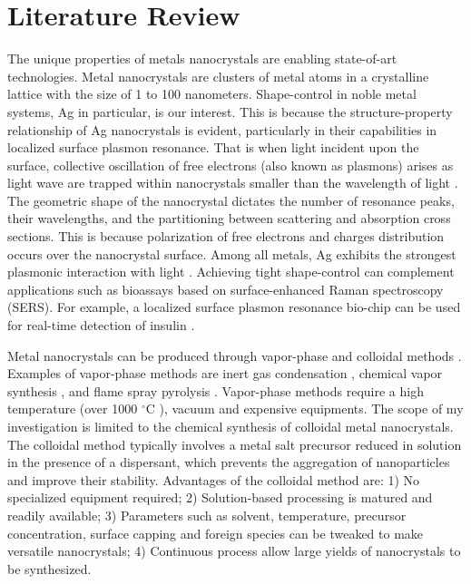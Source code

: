 \section{Literature Review}

The unique properties of metals nanocrystals are enabling state-of-art technologies.
Metal nanocrystals are clusters of metal atoms in a crystalline lattice with the size of 1 to 100 nanometers.
Shape-control in noble metal systems, Ag in particular, is our interest.
This is because the structure-property relationship of Ag nanocrystals is evident, particularly in their capabilities in localized surface plasmon resonance.
That is when light incident upon the surface, collective oscillation of free electrons (also known as plasmons) arises as light wave are trapped within nanocrystals smaller than the wavelength of light \cite{Petryayeva_2011}.
The geometric shape of the nanocrystal dictates the number of resonance peaks, their wavelengths, and the partitioning between scattering and absorption cross sections.
This is because polarization of free electrons and charges distribution occurs over the nanocrystal surface.
Among all metals, Ag exhibits the strongest plasmonic interaction with light \cite{Lu_2009}.
Achieving tight shape-control can complement applications such as bioassays based on surface-enhanced Raman spectroscopy (SERS).
For example, a localized surface plasmon resonance bio-chip can be used for real-time detection of insulin \cite{Hiep_2008}.

Metal nanocrystals can be produced through vapor-phase \cite{Swihart_2003} and colloidal methods \cite{Tao_2008}. Examples of vapor-phase methods are inert gas condensation \cite{Wegner_2002,Simchi_2007}, chemical vapor synthesis \cite{Lee_2012,Ostraat_2001}, and flame spray pyrolysis \cite{Teoh_2010}. 
Vapor-phase methods require a high temperature (over 1000 $^{\circ}$C \cite{Smetana_2005}), vacuum and expensive equipments.
The scope of my investigation is limited to the chemical synthesis of colloidal metal nanocrystals.
The colloidal method typically involves a metal salt precursor reduced in solution in the presence of a dispersant, which prevents the aggregation of nanoparticles and improve their stability.
Advantages of the colloidal method are: 
1) No specialized equipment required; 
2) Solution-based processing is matured and readily available;
3) Parameters such as solvent, temperature, precursor concentration, surface capping and foreign species can be tweaked to make versatile nanocrystals;
4) Continuous process allow large yields of nanocrystals to be synthesized.

